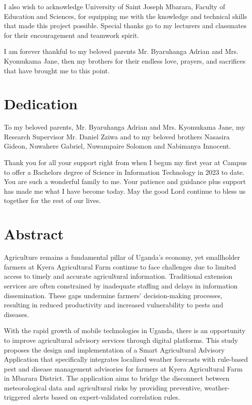 \documentclass[12pt]{report}
\begin{document}
I also wish to acknowledge University of Saint Joseph Mbarara, Faculty of Education and Sciences, for equipping me with the knowledge and technical skills that made this project possible. Special thanks go to my lecturers and classmates for their encouragement and teamwork spirit.

I am forever thankful to my beloved parents Mr. Byaruhanga Adrian and Mrs. Kyomukama Jane, then my brothers for their endless love, prayers, and sacrifices that have brought me to this point.

\newpage
\thispagestyle{empty}
\chapter*{Dedication}

To my beloved parents, Mr. Byaruhanga Adrian and Mrs. Kyomukama Jane, my Research Supervisor Mr. Daniel Zziwa and to my beloved brothers Nasasira Gideon, Nuwahere Gabriel, Nuwampaire Solomon and Nabimanya Innocent.

Thank you for all your support right from when I begun my first year at Campus to offer a Bachelors degree of Science in Information Technology in 2023 to date. You are such a wonderful family to me. Your patience and guidance plus support has made me what I have become today. May the good Lord continue to bless us together for the rest of our lives.

\newpage
{}
\setcounter{page}{4}
\chapter*{Abstract}

Agriculture remains a fundamental pillar of Uganda's economy, yet smallholder farmers at Kyera Agricultural Farm continue to face challenges due to limited access to timely and accurate agricultural information. Traditional extension services are often constrained by inadequate staffing and delays in information dissemination. These gaps undermine farmers' decision-making processes, resulting in reduced productivity and increased vulnerability to pests and diseases.

With the rapid growth of mobile technologies in Uganda, there is an opportunity to improve agricultural advisory services through digital platforms. This study proposes the design and implementation of a Smart Agricultural Advisory Application that specifically integrates localized weather forecasts with rule-based pest and disease management advisories for farmers at Kyera Agricultural Farm in Mbarara District. The application aims to bridge the disconnect between meteorological data and agricultural risks by providing preventive, weather-triggered alerts based on expert-validated correlation rules.
\end{document}
